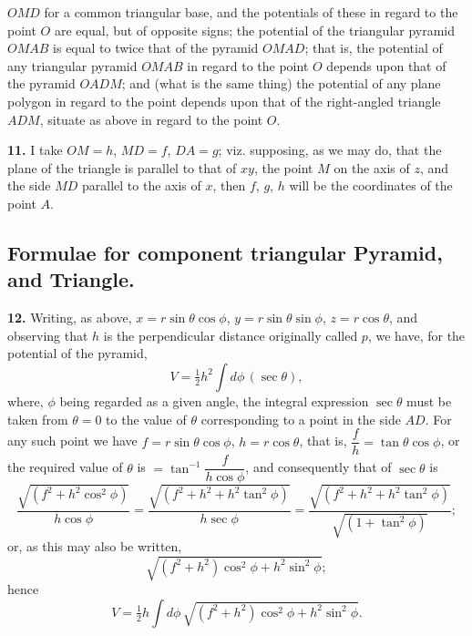 \documentclass[11pt,a4paper]{article}
\begin{document}
\newpage
\noindent $OMD$ for a common triangular base, and the potentials of these in regard to
the point $O$ are equal, but of opposite signs; the potential of the
triangular pyramid $OMAB$ is equal to twice that of the pyramid $OMAD$; that
is, the potential of any triangular pyramid $OMAB$ in regard to the point $O$
depends upon that of the pyramid $OADM$; and (what is the same thing) the
potential of any plane polygon in regard to the point depends upon that of
the right-angled triangle $ADM$, situate as above in regard to the point $O$.

\smallskip\noindent\textbf{11.}\quad
I take $OM=h$, $MD=f$, $DA=g$; viz. supposing, as we may do, that the plane
of the triangle is parallel to that of $xy$, the point $M$ on the axis of
$z$, and the side $MD$ parallel to the axis of $x$, then $f$, $g$, $h$ will
be the coordinates of the point $A$.

\subsection*{Formulae for component triangular Pyramid, and Triangle.}

\smallskip\noindent\textbf{12.}\quad
Writing, as above, $x=r\sin\theta\cos\phi$, $y=r\sin\theta\sin\phi$,
$z=r\cos\theta$, and observing that $h$ is the perpendicular distance
originally called $p$, we have, for the potential of the pyramid,
\[
V = \tfrac{1}{2}h^2 \int d\phi\,(\sec\theta),
\]
where, $\phi$ being regarded as a given angle, the integral expression
$\sec\theta$ must be taken from $\theta=0$ to the value of $\theta$
corresponding to a point in the side $AD$. For any such point we have
$f=r\sin\theta\cos\phi$, $h=r\cos\theta$, that is, $\dfrac{f}{h}=\tan\theta\cos\phi$,
or the required value of $\theta$ is $=\tan^{-1}\dfrac{f}{h\cos\phi}$, and
consequently that of $\sec\theta$ is
\[
\frac{\sqrt{(f^2+h^2\cos^2\phi)}}{h\cos\phi}
= \frac{\sqrt{(f^2+h^2+h^2\tan^2\phi)}}{h\sec\phi}
= \frac{\sqrt{(f^2+h^2+h^2\tan^2\phi)}}{\sqrt{(1+\tan^2\phi)}};
\]
or, as this may also be written,
\[
\sqrt{(f^2+h^2)\cos^2\phi + h^2\sin^2\phi};
\]
hence
\[
V = \tfrac{1}{2}h \int d\phi\,
    \sqrt{(f^2+h^2)\cos^2\phi + h^2\sin^2\phi}.
\]
\end{document}
